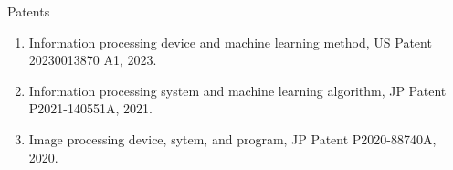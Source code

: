 \begin{rSection}{Patents}
\begin{enumerate}
    \item Information processing device and machine learning method, US Patent 20230013870 A1, 2023.
    \item Information processing system and machine learning algorithm, JP Patent P2021-140551A, 2021.
    \item Image processing device, sytem, and program, JP Patent P2020-88740A, 2020.
\end{enumerate}
\end{rSection}